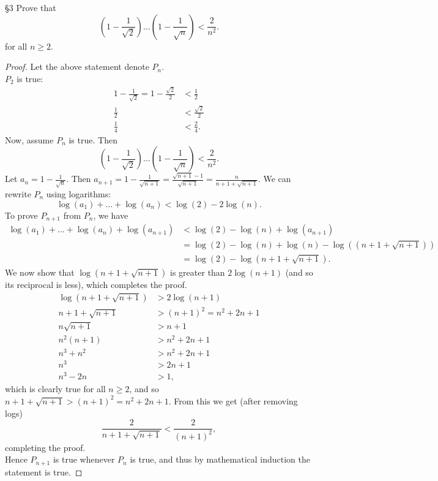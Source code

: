\documentclass{homework}
\begin{document}
\begin{problem}{\S 3}
  Prove that \[
    \left( 1-\frac{1}{\sqrt{2} } \right) \ldots\left( 1-\frac{1}{\sqrt{n} } \right) < \frac{2}{n^2}
  .\] for all $n\ge 2$.
\end{problem}
\begin{proof}[Proof]
  Let the above statement denote $P_n$.\\
   $P_2$ is true:
    \begin{align*}
      1-\frac{1}{\sqrt{2}} = 1 - \frac{\sqrt{2}}{2} &< \frac{1}{2}\\
      \frac{1}{2}&<\frac{\sqrt{2} }{2}\\
      \frac{1}{4}&<\frac{2}{4}
   .\end{align*}
   Now, assume $P_n$ is true. Then \[
    \left( 1-\frac{1}{\sqrt{2} } \right) \ldots\left( 1-\frac{1}{\sqrt{n} } \right) < \frac{2}{n^2} 
   .\] 
   Let $a_n = 1-\frac{1}{\sqrt{n} }$. Then $a_{n+1} = 1-\frac{1}{\sqrt{n+1} }=\frac{\sqrt{n+1}
   -1}{\sqrt{n+1} }=\frac{n}{n+1+\sqrt{n+1} }$. We can rewrite $P_n$ using logarithms:  \[
     \log{\left(a_1\right)}+\ldots+\log{\left(a_n\right)} < \log{\left(2\right)}-2\log{\left(n\right)}
   .\] To prove $P_{n+1}$ from  $P_n$, we have 
    \begin{align*}
      \log{\left(a_1\right)}+\ldots+\log{\left(a_n\right)}+\log{\left(a_{n+1}\right)} &<
        \log{\left(2\right)}-\log{\left(n\right)}+\log{\left(a_{n+1}\right)} \\
              &= \log{\left(2\right)}-\log{\left(n\right)}+\log{\left(n\right)}-\log{\left((n+1+\sqrt{n+1} )\right)} \\
              &= \log{\left(2\right)}-\log{\left(n+1+\sqrt{n+1} \right)}
   .\end{align*} We now show that $\log{\left(n+1+\sqrt{n+1} \right)}$ is greater than
   $2\log{\left(n+1\right)}$ (and so its reciprocal is less), which completes the proof.
   \begin{align*}
     \log{\left(n+1+\sqrt{n+1} \right)} &> 2\log{\left(n+1\right)}\\
     n+1+\sqrt{n+1} &> (n+1)^2=n^2+2n+1\\
     n\sqrt{n+1} &> n+1\\
     n^2(n+1) &> n^2+2n+1\\
     n^3+n^2 &> n^2+2n+1\\
     n^3&>2n+1\\
     n^3-2n&>1
   ,\end{align*} which is clearly true for all $n\ge 2$, and so $ n+1+\sqrt{n+1} >
   (n+1)^2=n^2+2n+1$. From this we get (after removing logs) \[
     \frac{2}{n+1+\sqrt{n+1} } < \frac{2}{(n+1)^2}
   ,\] completing the proof. \\
   Hence $P_{n+1}$ is true whenever  $P_n$ is true, and thus by mathematical induction the statement
   is true.
\end{proof}
\end{document}
